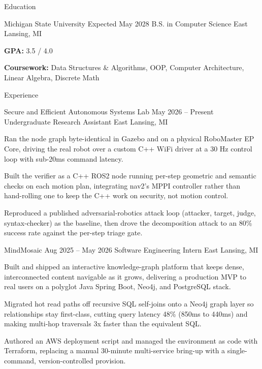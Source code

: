 \documentclass[
	11pt
]{../../../template}
\begin{document}
	\begin{rSection}{E}{ducation}
		\begin{rSectionEntry}
			{Michigan State University}
			{Expected May 2028}
			{B.S. in Computer Science}
			{}
			{East Lansing, MI}

			\item \textbf{GPA:} 3.5 / 4.0
			\item \textbf{Coursework:} Data Structures \& Algorithms, OOP, Computer Architecture, Linear Algebra, Discrete Math
		\end{rSectionEntry}
	\end{rSection}

	\begin{rSection}{E}{xperience}
		\begin{rSectionEntry}
			{Secure and Efficient Autonomous Systems Lab}
			{May 2026 -- Present}
			{Undergraduate Research Assistant}
			{}
			{East Lansing, MI}

			\item Ran the node graph byte-identical in Gazebo and on a physical RoboMaster EP Core, driving the real robot over a custom C++ WiFi driver at a 30 Hz control loop with sub-20ms command latency.
			\item Built the verifier as a C++ ROS2 node running per-step geometric and semantic checks on each motion plan, integrating nav2's MPPI controller rather than hand-rolling one to keep the C++ work on security, not motion control.
			\item Reproduced a published adversarial-robotics attack loop (attacker, target, judge, syntax-checker) as the baseline, then drove the decomposition attack to an 80\% success rate against the per-step triage gate.
		\end{rSectionEntry}

		\begin{rSectionEntry}
			{MindMosaic}
			{Aug 2025 -- May 2026}
			{Software Engineering Intern}
			{}
			{East Lansing, MI}

			\item Built and shipped an interactive knowledge-graph platform that keeps dense, interconnected content navigable as it grows, delivering a production MVP to real users on a polyglot Java Spring Boot, Neo4j, and PostgreSQL stack.
			\item Migrated hot read paths off recursive SQL self-joins onto a Neo4j graph layer so relationships stay first-class, cutting query latency 48\% (850ms to 440ms) and making multi-hop traversals 3x faster than the equivalent SQL.
			\item Authored an AWS deployment script and managed the environment as code with Terraform, replacing a manual 30-minute multi-service bring-up with a single-command, version-controlled provision.
		\end{rSectionEntry}


\end{rSection}
\end{document}
